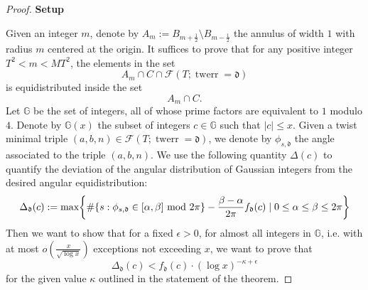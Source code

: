 \documentclass[12pt]{amsart}
\numberwithin{equation}{section} %
\theoremstyle{definition} \newtheorem{definition}[counter]{Definition}
\theoremstyle{remark} \newtheorem{nonexam}[counter]{Non-example}
\newcommand{\FF}{\mathscr{F}} %
\let\originalleft\left \let\originalright\right
\renewcommand{\left}{\mathopen{}\mathclose\bgroup\originalleft}
\renewcommand{\right}{\aftergroup\egroup\originalright}
\DeclareMathOperator{\twerr}{twerr} %
\begin{document}
\begin{proof}

\medskip 
\textbf{Setup}
\medskip

    Given an integer $m$, denote by $A_m := B_{m + \frac{1}{2}} \setminus B_{m - \frac{1}{2}}$ the annulus of width $1$ with radius $m$ centered at the origin.
    It suffices to prove that for any positive integer $T^2 < m < MT^2$, the elements in the set 
    \begin{equation*}
        A_m \cap C \cap \FF(T; \twerr = \mathfrak{d})
    \end{equation*}
    is equidistributed inside the set 
    \begin{equation*}
        A_m \cap C.
    \end{equation*}
    Let $\mathbb{G}$ be the set of integers, all of whose prime factors are equivalent to $1$ modulo $4$. Denote by $\mathbb{G}(x)$ the subset of integers $c \in \mathbb{G}$ such that $|c| \leq x$. Given a twist minimal triple $(a,b,n) \in \FF(T; \twerr = \mathfrak{d})$, we denote by $\phi_{s,\mathfrak{d}}$ the angle associated to the triple $(a,b,n)$. We use the following quantity $\Delta(c)$ to quantify the deviation of the angular distribution of Gaussian integers from the desired angular equidistribution: 
    \begin{equation}
        \Delta_\mathfrak{d}(c) := \text{max} \left\{ \# \{s : \phi_{s,\mathfrak{d}} \in [\alpha, \beta] \text{ mod } 2\pi\} - \frac{\beta - \alpha}{2\pi} f_{\mathfrak{d}}(c) \; | \; 0 \leq \alpha \leq \beta \leq 2 \pi \right\}
    \end{equation}
    Then we want to show that for a fixed $\epsilon > 0$, for almost all integers in $\mathbb{G}$, i.e. with at most $o(\frac{x}{\sqrt{\log x}})$ exceptions not exceeding $x$, we want to prove that
    \begin{equation} \label{eq:equid_0}
        \Delta_\mathfrak{d}(c) < f_{\mathfrak{d}}(c) \cdot (\log x)^{-\kappa + \epsilon}
    \end{equation}
    for the given value $\kappa$ outlined in the statement of the theorem. 
    

\end{proof}
\end{document}

